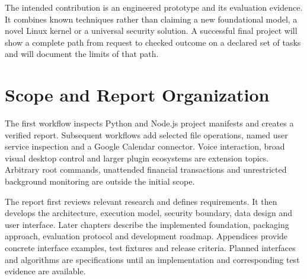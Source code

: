 The intended contribution is an engineered prototype and its evaluation evidence. It combines known techniques rather than claiming a new foundational model, a novel Linux kernel or a universal security solution. A successful final project will show a complete path from request to checked outcome on a declared set of tasks and will document the limits of that path.

\section{Scope and Report Organization}
The first workflow inspects Python and Node.js project manifests and creates a verified report. Subsequent workflows add selected file operations, named user service inspection and a Google Calendar connector. Voice interaction, broad visual desktop control and larger plugin ecosystems are extension topics. Arbitrary root commands, unattended financial transactions and unrestricted background monitoring are outside the initial scope.

The report first reviews relevant research and defines requirements. It then develops the architecture, execution model, security boundary, data design and user interface. Later chapters describe the implemented foundation, packaging approach, evaluation protocol and development roadmap. Appendices provide concrete interface examples, test fixtures and release criteria. Planned interfaces and algorithms are specifications until an implementation and corresponding test evidence are available.
